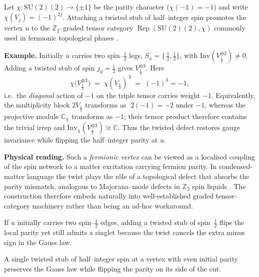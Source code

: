 \documentclass[11pt]{article}
\newcommand{\SU}{\mathrm{SU}(2)}
\newcommand{\Inv}{\mathrm{Inv}}
\begin{document}
\begin{remark}
\label{rem:twistedGauss}
Let $\chi\colon\SU(2)\!\to\!\{\pm1\}$ be the parity character
($\chi(-\mathbb 1)=-1$) and write
$\chi(V_j)=(-1)^{2j}$.  
Attaching a twisted stub of half–integer spin
promotes the vertex $u$ to the $\mathbb Z_2$–graded tensor
category $\operatorname{Rep}(\SU(2),\chi)$ commonly used in fermionic
topological phases \cite[Sec.\,2]{Kitaev2006}.

\medskip\noindent
\textbf{Example.}  
Initially $u$ carries two spin–$\tfrac12$ legs,
$S_u=\{\,\tfrac12,\tfrac12\}$, with 
$\Inv(V_{\tfrac12}^{\otimes2})\neq0$.
Adding a twisted stub of spin
$j_d=\tfrac12$ gives $V_{\tfrac12}^{\otimes3}$.
Here 
\[
  \chi\!\bigl(V_{\tfrac12}^{\otimes3}\bigr)
  \;=\;
  \chi(V_{\tfrac12})^{\,3}
  \;=\;
  (-1)^{3}
  =-1,
\]
i.e.\ the \emph{diagonal} action of $-1$ on the triple tensor
carries weight $-1$.  Equivalently, the multiplicity block
$2V_{\tfrac12}$ transforms as $\;2(-1)=-2$ under $-1$,
whereas the projective module
$\mathbb C_{\chi}$ transforms as $-1$;
their tensor product therefore contains the trivial irrep and
\(
\Inv_{\chi}(V_{\tfrac12}^{\otimes3})\cong\mathbb C.
\)
Thus the twisted defect restores gauge invariance while flipping the
half–integer parity at $u$.

\medskip
\textbf{Physical reading.}
Such a \emph{fermionic vertex} can be viewed as a localised coupling of
the spin network to a matter excitation carrying fermion parity.
In condensed-matter language the twist plays the rôle of a
topological defect that absorbs the parity mismatch, analogous to
Majorana–mode defects in $\mathbb Z_2$ spin liquids
\cite{GaiottoJohnson2020}.  The construction therefore embeds naturally
into well-established graded tensor-category machinery rather than being
an ad-hoc workaround.
\end{remark}

\begin{example}\label{ex:defect}
If $u$ initially carries two spin–$\tfrac12$ edges, adding a twisted stub
of spin~$\tfrac12$ flips the local parity yet still admits a singlet
because the twist cancels the extra minus sign in the Gauss law.
\end{example}

\begin{lemma}\label{lem:defectGauge}
A single twisted stub of half–integer spin at a vertex with even initial
parity preserves the Gauss law while flipping the parity on its side of
the cut.
\end{lemma}
\end{document}
